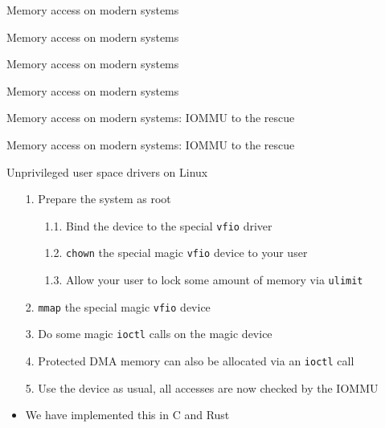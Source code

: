 \documentclass[NET,english,aspectratio=169,notitleframe]{tumbeamer}
\begin{document}
\begin{frame}{Memory access on modern systems}
\centering
\end{frame}

\begin{frame}{Memory access on modern systems}
\centering
\end{frame}

\begin{frame}{Memory access on modern systems}
\centering
\end{frame}

\begin{frame}{Memory access on modern systems}
\centering
\end{frame}

\begin{frame}{Memory access on modern systems: IOMMU to the rescue}
\centering
\end{frame}

\begin{frame}{Memory access on modern systems: IOMMU to the rescue}
\centering
\end{frame}

\begin{frame}{Unprivileged user space drivers on Linux}
\begin{itemize}
\item[1.] Prepare the system as root
\begin{itemize}
\item[1.1.] Bind the device to the special \texttt{vfio} driver
\item[1.2.] \texttt{chown} the special magic \texttt{vfio} device to your user
\item[1.3.] Allow your user to lock some amount of memory via \texttt{ulimit}
\end{itemize}
\pause
\item[2.] \texttt{mmap} the special magic \texttt{vfio} device
\item[3.] Do some magic \texttt{ioctl} calls on the magic device
\item[4.] Protected DMA memory can also be allocated via an \texttt{ioctl} call
\item[5.] Use the device as usual, all accesses are now checked by the IOMMU
\vspace{1em}
\pause
\item We have implemented this in C and Rust
\end{itemize}
\end{frame}
\end{document}
